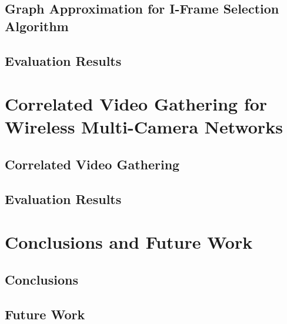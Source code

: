 \documentclass[slidestop,compress,mathserif]{beamer}
\begin{document}
\subsection{Graph Approximation for I-Frame Selection Algorithm}

\subsection{Evaluation Results}


\section{Correlated Video Gathering for Wireless Multi-Camera Networks}
%
\subsection{Correlated Video Gathering}

\subsection{Evaluation Results}


\section{Conclusions and Future Work}
\subsection{Conclusions}

\subsection{Future Work}

%
\end{document}
